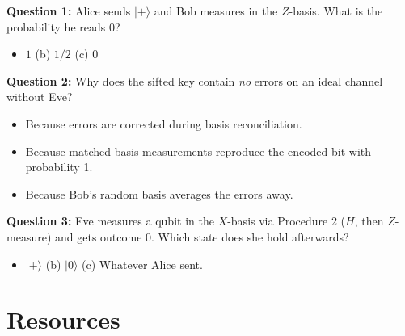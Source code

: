 \documentclass[a4paper,11pt]{article}
\providecommand{\ket}[1]{|#1\rangle}
\begin{document}
\begin{reflectionbox}
\textbf{Question 1:} Alice sends $\ket{+}$ and Bob measures in the $Z$-basis. What
is the probability he reads 0?
\begin{itemize}
    \item[(a)] $1$ \qquad (b) $1/2$ \qquad (c) $0$
\end{itemize}

\textbf{Question 2:} Why does the sifted key contain \emph{no} errors on an ideal
channel without Eve?
\begin{itemize}
    \item[(a)] Because errors are corrected during basis reconciliation.
    \item[(b)] Because matched-basis measurements reproduce the encoded bit with
               probability 1.
    \item[(c)] Because Bob's random basis averages the errors away.
\end{itemize}

\textbf{Question 3:} Eve measures a qubit in the $X$-basis via Procedure 2 ($H$,
then $Z$-measure) and gets outcome 0. Which state does she hold afterwards?
\begin{itemize}
    \item[(a)] $\ket{+}$ \qquad (b) $\ket{0}$ \qquad (c) Whatever Alice sent.
\end{itemize}
\end{reflectionbox}

\section{Resources}
\end{document}
